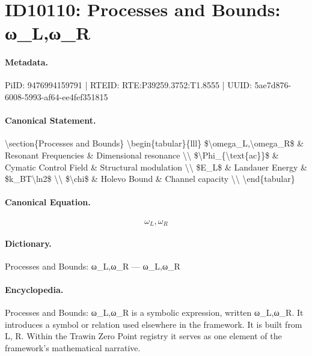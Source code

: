 \section*{ID10110: Processes and Bounds: ω\_L,ω\_R}
\paragraph{Metadata.}
PiID: 9476994159791 | RTEID: RTE:P39259.3752:T1.8555 | UUID: 5ae7d876-6008-5993-af64-ee4fef351815

\paragraph{Canonical Statement.}
\textbackslash{}section\{Processes and Bounds\} \textbackslash{}begin\{tabular\}\{lll\} \$\textbackslash{}omega\_L,\textbackslash{}omega\_R\$ \& Resonant Frequencies \& Dimensional resonance \textbackslash{}\textbackslash{} \$\textbackslash{}Phi\_\{\textbackslash{}text\{ac\}\}\$ \& Cymatic Control Field \& Structural modulation \textbackslash{}\textbackslash{} \$E\_L\$ \& Landauer Energy \& \$k\_BT\textbackslash{}ln2\$ \textbackslash{}\textbackslash{} \$\textbackslash{}chi\$ \& Holevo Bound \& Channel capacity \textbackslash{}\textbackslash{} \textbackslash{}end\{tabular\}

\paragraph{Canonical Equation.}
\[
\omega_L,\omega_R
\]

\paragraph{Dictionary.}
Processes and Bounds: ω\_L,ω\_R — ω\_L,ω\_R

\paragraph{Encyclopedia.}
Processes and Bounds: ω\_L,ω\_R is a symbolic expression, written ω\_L,ω\_R. It introduces a symbol or relation used elsewhere in the framework. It is built from L, R. Within the Trawin Zero Point registry it serves as one element of the framework's mathematical narrative.
